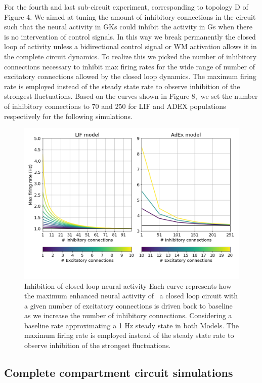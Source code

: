\documentclass[10pt]{article}
\begin{document}
For the fourth and last sub-circuit experiment, corresponding to
topology D of Figure 4. We aimed at tuning the amount of inhibitory
connections in the circuit such that the neural activity in GKs could
inhibit the activity in Gs when there is no intervention of control
signals. In this way we break permanently the closed loop of activity
unless a bidirectional control signal or WM activation allows it in
the complete circuit dynamics. To realize this we picked the number of
inhibitory connections necessary to inhibit max firing rates for the
wide range of number of excitatory connections allowed by the closed
loop dynamics. The maximum firing rate is employed instead of the
steady state rate to observe inhibition of the strongest fluctuations.
Based on the curves shown in Figure 8,~we set the number of inhibitory
connections to 70 and 250 for LIF and ADEX populations respectively
for the following simulations.



\begin{figure}[h!]
  \begin{center}
    \includegraphics[width=0.70\columnwidth]{figures/experiment_4/experiment_4}
    \caption{Inhibition of closed loop neural activity
      {\label{970310}} Each curve represents how the maximum enhanced
      neural activity of ~a closed loop circuit with a given number of
      excitatory connections is driven back to baseline as we increase
      the number of inhibitory connections. Considering a baseline
      rate approximating a 1 Hz steady state in both Models. The
      maximum firing rate is employed instead of the steady state rate
      to observe inhibition of the strongest fluctuations. }
    \label{970310}
  \end{center}
\end{figure}

\subsection{Complete compartment circuit simulations}
\end{document}
